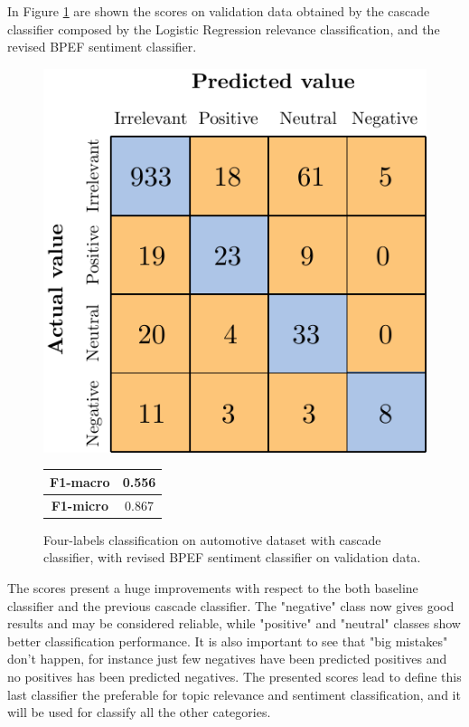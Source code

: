 In Figure \ref{fig:ita_cascade_bpef_val} are shown the scores on validation data obtained by the cascade classifier composed by the Logistic Regression relevance classification, and the revised BPEF sentiment classifier.

\begin{figure}[H]
	\begin{minipage}[b]{0.6\linewidth}
		\centering
		\includegraphics[scale=1]{figures/conf_matrices/ita_cascade_bpef/ita_cascade_bpef_val.pdf}
	\end{minipage}
	\begin{minipage}[b]{0.3\linewidth}
		\begin{tabular}[b]{ | c | c | } 
			\hline
			\textbf{F1-macro} & 0.556 \\
			\hline
			\textbf{F1-micro} & 0.867 \\ 
			\hline
		\end{tabular}
	\end{minipage}
	\caption{Four-labels classification on automotive dataset with cascade classifier, with revised BPEF sentiment classifier on validation data.}
	\label{fig:ita_cascade_bpef_val}
\end{figure}


The scores present a huge improvements with respect to the both baseline classifier and the previous cascade classifier. The "negative" class now gives good results and may be considered reliable, while "positive" and "neutral" classes show better classification performance. It is also important to see that "big mistakes" don't happen, for instance just few negatives have been predicted positives and no positives has been predicted negatives. The presented scores lead to define this last classifier the preferable for topic relevance and sentiment classification, and it will be used for classify all the other categories.






